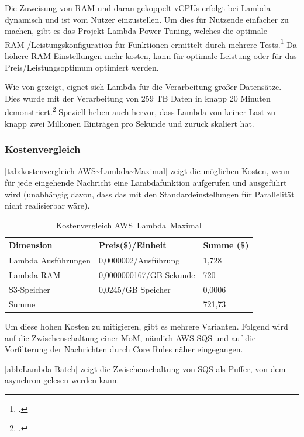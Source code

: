 Die Zuweisung von \ac{RAM} und daran gekoppelt vCPUs erfolgt bei Lambda dynamisch und ist vom Nutzer einzustellen. Um dies für Nutzende einfacher zu machen, gibt es das Projekt Lambda Power Tuning, welches die optimale \ac{RAM}-/Leistungskonfiguration für Funktionen ermittelt durch mehrere Tests.\footcite[Vgl. auch im Folgenden][]{AmazonWebServicesInc..o.J.at} Da höhere \ac{RAM} Einstellungen mehr kosten, kann für optimale Leistung oder für das Preis/Leistungsoptimum optimiert werden.

Wie von \citeauthor{Madden.2019} gezeigt, eignet sich Lambda für die Verarbeitung großer Datensätze. 
Dies wurde mit der Verarbeitung von 259 TB Daten in knapp 20 Minuten demonstriert.\footcite[Vgl. auch im Folgenden][]{Madden.2019} Speziell heben \citeauthor{Madden.2019} auch hervor, dass Lambda von keiner Last zu knapp zwei Millionen Einträgen pro Sekunde und zurück skaliert hat.

\subsubsection{Kostenvergleich}
\autoref{tab:kostenvergleich-AWS~Lambda~Maximal} zeigt die möglichen Kosten, wenn für jede eingehende Nachricht eine Lambdafunktion aufgerufen und ausgeführt wird (unabhängig davon, dass das mit den Standardeinstellungen für Parallelität nicht realisierbar wäre).
\begin{table}[H]
\centering
\begin{tabular}{|l|l|l|}
\hline
Dimension & Preis(\$)/Einheit & Summe (\$) \\ \hline
Lambda Ausführungen & 0,0000002/Ausführung & 1,728 \\ \hline
Lambda \ac{RAM} & 0,0000000167/GB-Sekunde & 720 \\ \hline
\ac{S3}-Speicher & 0,0245/GB Speicher & 0,0006 \\ \hline
Summe & \cellcolor[HTML]{EFEFEF} & \underline{721,73} \\ \hline
\end{tabular}
\caption{Kostenvergleich AWS~Lambda~Maximal}
\label{tab:kostenvergleich-AWS~Lambda~Maximal}
\end{table}

Um diese hohen Kosten zu mitigieren, gibt es mehrere Varianten. Folgend wird auf die Zwischenschaltung einer \ac{MoM}, nämlich \ac{AWS} \ac{SQS} und auf die Vorfilterung der Nachrichten durch \AWSIOT{} Core Rules näher eingegangen.

\autoref{abb:Lambda-Batch} zeigt die Zwischenschaltung von \ac{SQS} als Puffer, von dem asynchron gelesen werden kann.

